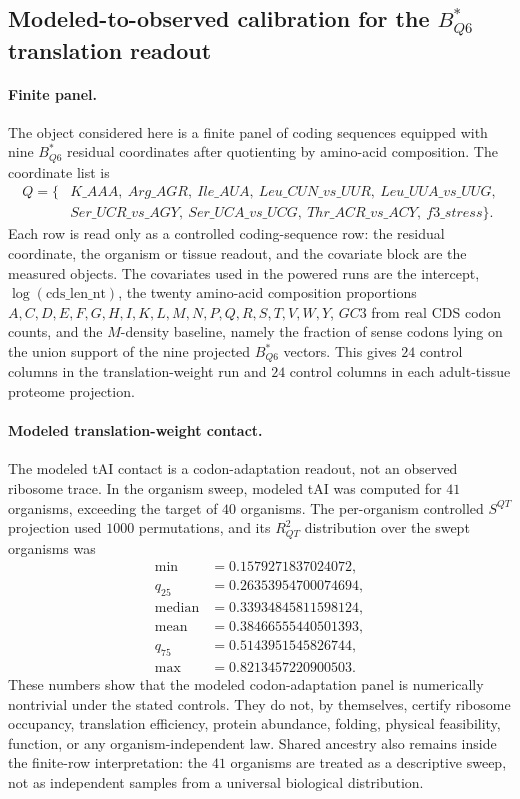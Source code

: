 \subsection{Modeled-to-observed calibration for the $B^{*}_{Q6}$ translation readout}
\label{sec:q6-modeled-observed-translation-readout-calibration}

\paragraph{Finite panel.}
The object considered here is a finite panel of coding sequences equipped with nine $B^{*}_{Q6}$ residual coordinates after quotienting by amino-acid composition.  The coordinate list is
$$
\begin{aligned}
Q=\{&K\_AAA,\ Arg\_AGR,\ Ile\_AUA,\ Leu\_CUN\_vs\_UUR,\ Leu\_UUA\_vs\_UUG,\\
&Ser\_UCR\_vs\_AGY,\ Ser\_UCA\_vs\_UCG,\ Thr\_ACR\_vs\_ACY,\ f3\_stress\}.
\end{aligned}
$$
Each row is read only as a controlled coding-sequence row: the residual coordinate, the organism or tissue readout, and the covariate block are the measured objects.  The covariates used in the powered runs are the intercept, $\log(\mathrm{cds\_len\_nt})$, the twenty amino-acid composition proportions $A,C,D,E,F,G,H,I,K,L,M,N,P,Q,R,S,T,V,W,Y$, $GC3$ from real CDS codon counts, and the $M$-density baseline, namely the fraction of sense codons lying on the union support of the nine projected $B^{*}_{Q6}$ vectors.  This gives $24$ control columns in the translation-weight run and $24$ control columns in each adult-tissue proteome projection.

\paragraph{Modeled translation-weight contact.}
The modeled tAI contact is a codon-adaptation readout, not an observed ribosome trace.  In the organism sweep, modeled tAI was computed for $41$ organisms, exceeding the target of $40$ organisms.  The per-organism controlled $S^{QT}$ projection used $1000$ permutations, and its $R^{2}_{QT}$ distribution over the swept organisms was
$$
\begin{aligned}
\min &=0.1579271837024072,\\
q_{25} &=0.26353954700074694,\\
\mathrm{median} &=0.33934845811598124,\\
\mathrm{mean} &=0.38466555440501393,\\
q_{75} &=0.5143951545826744,\\
\max &=0.8213457220900503.
\end{aligned}
$$
These numbers show that the modeled codon-adaptation panel is numerically nontrivial under the stated controls.  They do not, by themselves, certify ribosome occupancy, translation efficiency, protein abundance, folding, physical feasibility, function, or any organism-independent law.  Shared ancestry also remains inside the finite-row interpretation: the $41$ organisms are treated as a descriptive sweep, not as independent samples from a universal biological distribution.

